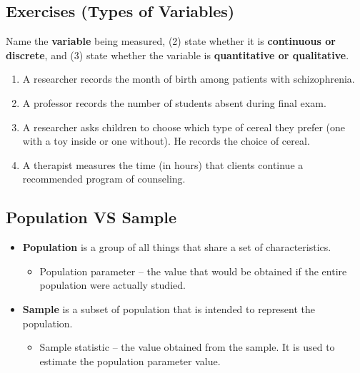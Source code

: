 \documentclass[]{article}
\providecommand{\tightlist}{%
  \setlength{\itemsep}{0pt}\setlength{\parskip}{0pt}}
\begin{document}
\hypertarget{exercises-types-of-variables}{%
\subsection{Exercises (Types of
Variables)}\label{exercises-types-of-variables}}

Name the \textbf{variable} being measured, (2) state whether it is
\textbf{continuous or discrete}, and (3) state whether the variable is
\textbf{quantitative or qualitative}.

\begin{enumerate}
\def\labelenumi{\arabic{enumi}.}
\tightlist
\item
  A researcher records the month of birth among patients with
  schizophrenia.
\item
  A professor records the number of students absent during final exam.
\item
  A researcher asks children to choose which type of cereal they prefer
  (one with a toy inside or one without). He records the choice of
  cereal.
\item
  A therapist measures the time (in hours) that clients continue a
  recommended program of counseling.
\end{enumerate}

\hypertarget{population-vs-sample}{%
\subsection{Population VS Sample}\label{population-vs-sample}}

\begin{itemize}
\tightlist
\item
  {\textbf{Population}} is a group of all things that share a set of
  characteristics.

  \begin{itemize}
  \tightlist
  \item
    Population parameter -- the value that would be obtained if the
    entire population were actually studied.
  \end{itemize}
\item
  {\textbf{Sample}} is a subset of population that is intended to
  represent the population.

  \begin{itemize}
  \tightlist
  \item
    Sample statistic -- the value obtained from the sample. It is used
    to estimate the population parameter value.
  \end{itemize}
\end{itemize}
\end{document}
